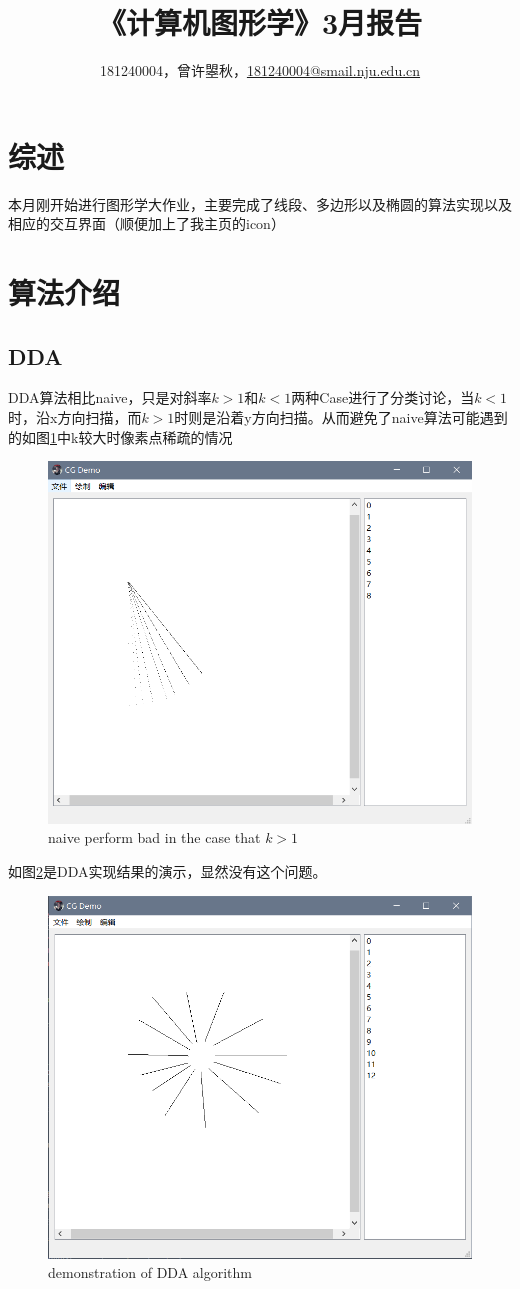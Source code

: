 \documentclass[a4paper,UTF8]{article}
\theoremstyle{definition}
\begin{document}
\title{\textbf{《计算机图形学》3月报告}}
\author{181240004，曾许曌秋，\href{mailto:181240004@smail.nju.edu.cn}{181240004@smail.nju.edu.cn}}
\maketitle

\section{综述}
本月刚开始进行图形学大作业，主要完成了线段、多边形以及椭圆的算法实现以及相应的交互界面（顺便加上了我主页的icon）

\section{算法介绍}
\subsection{DDA}
DDA算法相比naive，只是对斜率$k>1$和$k<1$两种Case进行了分类讨论，当$k<1$时，沿x方向扫描，而$k>1$时则是沿着y方向扫描。从而避免了naive算法可能遇到的如图\ref{fig1}中k较大时像素点稀疏的情况
\begin{figure}[h]
    \centering
    \includegraphics[width = .5\textwidth]{./source/pics/alg_naive.PNG}
    \caption{naive perform bad in the case that $k>1$}
    \label{fig1}
\end{figure}
\par
如图\ref{fig2}是DDA实现结果的演示，显然没有这个问题。
\begin{figure}
    \centering
    \includegraphics[width = .5\textwidth]{./source/pics/alg_dda.PNG}
    \caption{demonstration of DDA algorithm}
    \label{fig2}
\end{figure}
\end{document}
